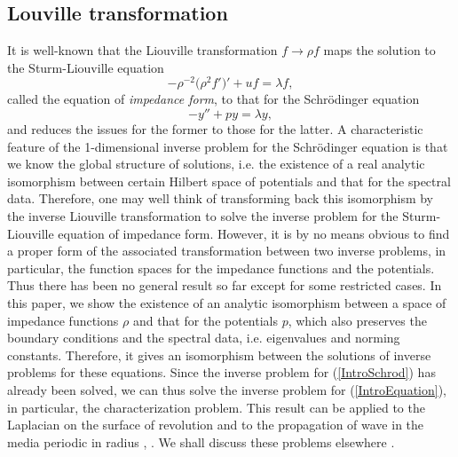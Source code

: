 \documentclass[10pt]{amsart}
\begin{document}
\subsection{Louville transformation}
It is well-known that the Liouville transformation $f \to \rho f$
maps the solution to the Sturm-Liouville equation
\begin{equation}
- \rho^{-2}\big(\rho^2 f'\big)' + uf = \lambda f,
\label{IntroEquation}
\end{equation}
called the equation of {\it impedance form}, to that for  the
Schr{\"o}dinger equation
\begin{equation}
- y'' + py = \lambda y,
\label{IntroSchrod}
\end{equation}
and reduces the issues for the former to those for the latter. A
characteristic feature of the 1-dimensional inverse problem for the
Schr{\"o}dinger equation is that we know the global structure of
solutions, i.e. the existence of a real analytic isomorphism between
certain Hilbert space of potentials and that for the spectral data.
Therefore, one may well think of transforming back this isomorphism
by the inverse Liouville transformation to solve the inverse problem
for the Sturm-Liouville equation of impedance form. However, it is
by no means obvious to find a proper form of the associated
transformation between two inverse problems, in particular,
the function spaces for the impedance functions  and the potentials.
Thus  there has been no general result so far  except for some
restricted cases. In this paper, we show the existence of an
analytic isomorphism between a space of impedance functions $\rho$
and that for the potentials $p$, which also preserves the boundary
conditions and the spectral data, i.e. eigenvalues and norming
constants. Therefore, it gives an isomorphism between the solutions
of inverse problems for these equations. Since the inverse problem
for (\ref{IntroSchrod}) has already been solved, we can thus solve
the inverse problem for (\ref{IntroEquation}), in particular, the
characterization problem. This result can be applied to the
Laplacian on the surface of revolution \cite{G95} and to the
propagation of wave in the media periodic in radius \cite{TS09},
\cite{TS10}.  We shall discuss these problems elsewhere \cite{IK13}.
\end{document}

